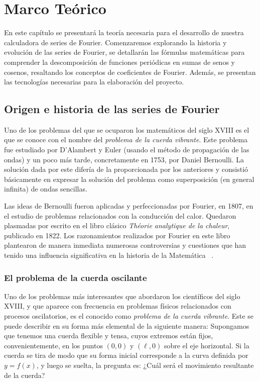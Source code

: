 \chapter{Marco Teórico}\label{ch:Marco Teórico}
En este capítulo se presentará la teoría necesaria para el desarrollo de nuestra calculadora de series de Fourier. Comenzaremos explorando la historia y evolución de las series de Fourier, se detallarán las fórmulas matemáticas para comprender la descomposición de funciones periódicas en sumas de senos y cosenos, resaltando los conceptos de coeficientes de Fourier. Además, se presentan las tecnologías necesarias para la elaboración del proyecto.

\section{Origen e historia de las series de Fourier}
Uno de los problemas del que se ocuparon los matemáticos del siglo XVIII es el que se conoce con el nombre del \textit{problema de la cuerda vibrante}. Este problema fue estudiado por D’Alambert y Euler (usando el método de propagación de las ondas) y un poco más tarde, concretamente en 1753, por Daniel Bernoulli. La solución dada por este difería de la proporcionada por los anteriores y consistió básicamente en expresar la solución del problema como superposición (en general infinita) de ondas sencillas. 

Las ideas de Bernoulli fueron aplicadas y perfeccionadas por Fourier, en 1807, en el estudio de problemas relacionados con la conducción del calor. Quedaron plasmadas por escrito en el libro clásico \emph{Théorie analytique de la chaleur}, publicado en 1822. Los razonamientos realizados por Fourier en este libro plantearon de manera inmediata numerosas controversias y cuestiones que han tenido una influencia significativa en la historia de la Matemática ~\cite{historia-alambert-fourier-euler}.

\subsection{El problema de la cuerda oscilante}

Uno de los problemas más interesantes que abordaron los científicos del siglo XVIII, y que aparece con frecuencia en problemas físicos relacionados con procesos oscilatorios, es el conocido como \textit{problema de la cuerda vibrante}. Este se puede describir en su forma más elemental de la siguiente manera: Supongamos que tenemos una cuerda flexible y tensa, cuyos extremos están fijos, convenientemente, en los puntos $(0, 0)$ y $(\ell, 0)$ sobre el eje horizontal. Si la cuerda se tira de modo que su forma inicial corresponde a la curva definida por $y = f(x)$, y luego se suelta, la pregunta es: ¿Cuál será el movimiento resultante de la cuerda?

